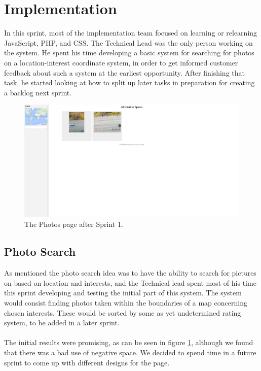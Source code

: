 \section{Implementation}
\label{sec:S1Implementation}
In this sprint, most of the implementation team focused on learning or relearning JavaScript, PHP, and CSS. The Technical Lead was the only person working on the system. He spent his time developing a basic system for searching for photos on a location-interest coordinate system, in order to get informed customer feedback about such a system at the earliest opportunity. After finishing that task, he started looking at how to split up later tasks in preparation for creating a backlog next sprint.

\begin{figure}[ht!]
\centering
\includegraphics[width=\linewidth]{./img/webpage/22Sep/Photos22Sep}
\caption{The Photos page after Sprint 1. \label{fig:Photos22Sep}}
\end{figure}

\subsection*{Photo Search}
As mentioned the photo search idea was to have the ability to search for pictures on based on location and interests, and the Technical lead spent most of his time this sprint developing and testing the initial part of this system. The system would consist finding photos taken within the boundaries of a map concerning chosen interests. These would be sorted by some as yet undetermined rating system, to be added in a later sprint.
\paragraph*{} The initial results were promising, as can be seen in figure \ref{fig:Photos22Sep}, although we found that there was a bad use of negative space. We decided to spend time in a future sprint to come up with different designs for the page.

